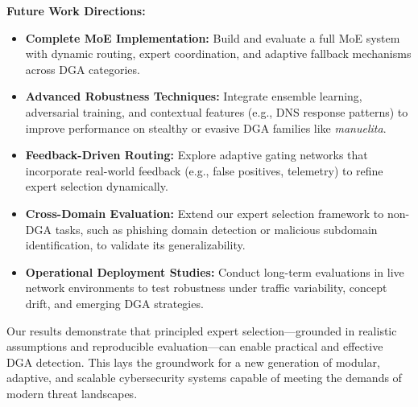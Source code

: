 \documentclass[a4paper]{llncs}
\begin{document}
\textbf{Future Work Directions:}
\begin{itemize}
    \item \textbf{Complete MoE Implementation:} Build and evaluate a full MoE system with dynamic routing, expert coordination, and adaptive fallback mechanisms across DGA categories.
    
    \item \textbf{Advanced Robustness Techniques:} Integrate ensemble learning, adversarial training, and contextual features (e.g., DNS response patterns) to improve performance on stealthy or evasive DGA families like \textit{manuelita}.
    
    \item \textbf{Feedback-Driven Routing:} Explore adaptive gating networks that incorporate real-world feedback (e.g., false positives, telemetry) to refine expert selection dynamically.
    
    \item \textbf{Cross-Domain Evaluation:} Extend our expert selection framework to non-DGA tasks, such as phishing domain detection or malicious subdomain identification, to validate its generalizability.
    
    \item \textbf{Operational Deployment Studies:} Conduct long-term evaluations in live network environments to test robustness under traffic variability, concept drift, and emerging DGA strategies.
\end{itemize}

Our results demonstrate that principled expert selection—grounded in realistic assumptions and reproducible evaluation—can enable practical and effective DGA detection. This lays the groundwork for a new generation of modular, adaptive, and scalable cybersecurity systems capable of meeting the demands of modern threat landscapes.




\end{document}
